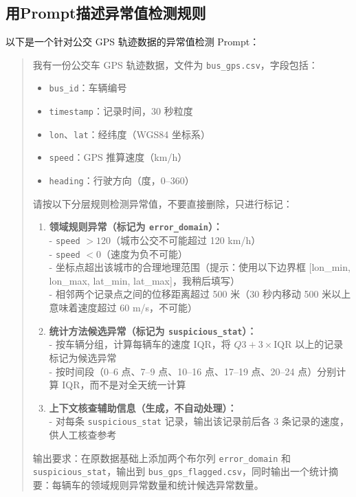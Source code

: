 \subsection{用Prompt描述异常值检测规则}

以下是一个针对公交 GPS 轨迹数据的异常值检测 Prompt：

\begin{quote}
我有一份公交车 GPS 轨迹数据，文件为 \texttt{bus\_gps.csv}，字段包括：

\begin{itemize}
  \item \texttt{bus\_id}：车辆编号
  \item \texttt{timestamp}：记录时间，30 秒粒度
  \item \texttt{lon}、\texttt{lat}：经纬度（WGS84 坐标系）
  \item \texttt{speed}：GPS 推算速度（km/h）
  \item \texttt{heading}：行驶方向（度，0--360）
\end{itemize}

请按以下分层规则检测异常值，不要直接删除，只进行标记：

\begin{enumerate}
  \item \textbf{领域规则异常（标记为 \texttt{error\_domain}）：}\\
    - \texttt{speed} $> 120$（城市公交不可能超过 120 km/h）\\
    - \texttt{speed} $< 0$（速度为负不可能）\\
    - 坐标点超出该城市的合理地理范围（提示：使用以下边界框 [lon\_min, lon\_max, lat\_min, lat\_max]，我稍后填写）\\
    - 相邻两个记录点之间的位移距离超过 500 米（30 秒内移动 500 米以上意味着速度超过 60 m/s，不可能）

  \item \textbf{统计方法候选异常（标记为 \texttt{suspicious\_stat}）：}\\
    - 按车辆分组，计算每辆车的速度 IQR，将 $Q3 + 3 \times \text{IQR}$ 以上的记录标记为候选异常\\
    - 按时间段（0--6 点、7--9 点、10--16 点、17--19 点、20--24 点）分别计算 IQR，而不是对全天统一计算

  \item \textbf{上下文核查辅助信息（生成，不自动处理）：}\\
    - 对每条 \texttt{suspicious\_stat} 记录，输出该记录前后各 3 条记录的速度，供人工核查参考
\end{enumerate}

输出要求：在原数据基础上添加两个布尔列 \texttt{error\_domain} 和 \texttt{suspicious\_stat}，输出到 \texttt{bus\_gps\_flagged.csv}，同时输出一个统计摘要：每辆车的领域规则异常数量和统计候选异常数量。
\end{quote}

